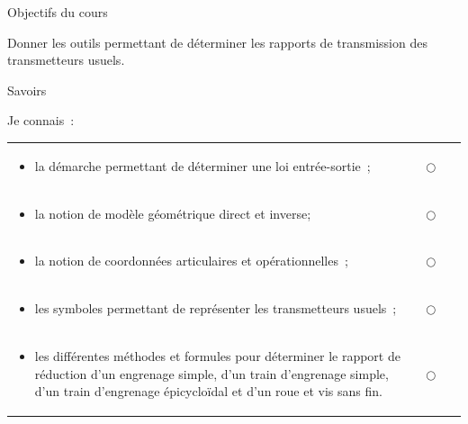 Objectifs du cours

Donner les outils permettant de déterminer les rapports de transmission
des transmetteurs usuels.

Savoirs

Je connais~:

\begin{center}\begin{tabular}[]{@{}
  >{\raggedright\arraybackslash}p{0.9045\linewidth}
  >{\raggedright\arraybackslash}p{0.0955\linewidth}@{}}

\begin{minipage}[b]{\linewidth}\raggedright
\begin{itemize}
\item
  la démarche permettant de déterminer une loi entrée-sortie~;
\end{itemize}
\end{minipage} & \begin{minipage}[b]{\linewidth}\raggedright
$\bigcirc$
\end{minipage} \\




\begin{minipage}[t]{\linewidth}\raggedright
\begin{itemize}
\item
  la notion de modèle géométrique direct et inverse;
\end{itemize}
\end{minipage} & $\bigcirc$ \\
\begin{minipage}[t]{\linewidth}\raggedright
\begin{itemize}
\item
  la notion de coordonnées articulaires et opérationnelles~;
\end{itemize}
\end{minipage} & $\bigcirc$ \\
\begin{minipage}[t]{\linewidth}\raggedright
\begin{itemize}
\item
  les symboles permettant de représenter les transmetteurs usuels~;
\end{itemize}
\end{minipage} & $\bigcirc$ \\
\begin{minipage}[t]{\linewidth}\raggedright
\begin{itemize}
\item
  les différentes méthodes et formules pour déterminer le rapport de
  réduction d'un engrenage simple, d'un train d'engrenage simple, d'un
  train d'engrenage épicycloïdal et d'un roue et vis sans fin.
\end{itemize}
\end{minipage} & $\bigcirc$ \\
\end{tabular}\end{center}

